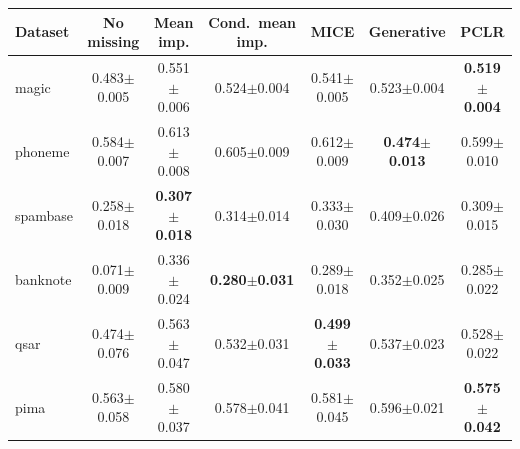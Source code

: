 \begin{tabular}{lcccccc}
\toprule
Dataset & No missing & Mean imp. & Cond.\ mean imp. & MICE & Generative & PCLR \\
\midrule
magic & 0.483{\scriptsize$\pm$0.005} & 0.551{\scriptsize$\pm$0.006} & 0.524{\scriptsize$\pm$0.004} & 0.541{\scriptsize$\pm$0.005} & 0.523{\scriptsize$\pm$0.004} & \textbf{0.519{\scriptsize$\pm$0.004}} \\
phoneme & 0.584{\scriptsize$\pm$0.007} & 0.613{\scriptsize$\pm$0.008} & 0.605{\scriptsize$\pm$0.009} & 0.612{\scriptsize$\pm$0.009} & \textbf{0.474{\scriptsize$\pm$0.013}} & 0.599{\scriptsize$\pm$0.010} \\
spambase & 0.258{\scriptsize$\pm$0.018} & \textbf{0.307{\scriptsize$\pm$0.018}} & 0.314{\scriptsize$\pm$0.014} & 0.333{\scriptsize$\pm$0.030} & 0.409{\scriptsize$\pm$0.026} & 0.309{\scriptsize$\pm$0.015} \\
banknote & 0.071{\scriptsize$\pm$0.009} & 0.336{\scriptsize$\pm$0.024} & \textbf{0.280{\scriptsize$\pm$0.031}} & 0.289{\scriptsize$\pm$0.018} & 0.352{\scriptsize$\pm$0.025} & 0.285{\scriptsize$\pm$0.022} \\
qsar & 0.474{\scriptsize$\pm$0.076} & 0.563{\scriptsize$\pm$0.047} & 0.532{\scriptsize$\pm$0.031} & \textbf{0.499{\scriptsize$\pm$0.033}} & 0.537{\scriptsize$\pm$0.023} & 0.528{\scriptsize$\pm$0.022} \\
pima & 0.563{\scriptsize$\pm$0.058} & 0.580{\scriptsize$\pm$0.037} & 0.578{\scriptsize$\pm$0.041} & 0.581{\scriptsize$\pm$0.045} & 0.596{\scriptsize$\pm$0.021} & \textbf{0.575{\scriptsize$\pm$0.042}} \\
\bottomrule
\end{tabular}
